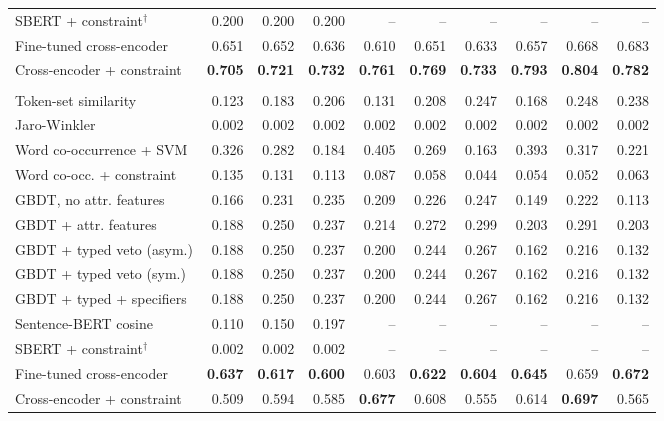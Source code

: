 \begin{table}[t]
{\begin{tabular}{lrrrrrrrrr}
SBERT + constraint$^{\dagger}$ & 0.200 & 0.200 & 0.200 & -- & -- & -- & -- & -- & -- \\
Fine-tuned cross-encoder & 0.651 & 0.652 & 0.636 & 0.610 & 0.651 & 0.633 & 0.657 & 0.668 & 0.683 \\
Cross-encoder + constraint & \textbf{0.705} & \textbf{0.721} & \textbf{0.732} & \textbf{0.761} & \textbf{0.769} & \textbf{0.733} & \textbf{0.793} & \textbf{0.804} & \textbf{0.782} \\
\addlinespace
\multicolumn{10}{l}{\textit{entity-level F1}} \\
Token-set similarity & 0.123 & 0.183 & 0.206 & 0.131 & 0.208 & 0.247 & 0.168 & 0.248 & 0.238 \\
Jaro-Winkler & 0.002 & 0.002 & 0.002 & 0.002 & 0.002 & 0.002 & 0.002 & 0.002 & 0.002 \\
Word co-occurrence + SVM \cite{peeters2024wdc} & 0.326 & 0.282 & 0.184 & 0.405 & 0.269 & 0.163 & 0.393 & 0.317 & 0.221 \\
Word co-occ. + constraint & 0.135 & 0.131 & 0.113 & 0.087 & 0.058 & 0.044 & 0.054 & 0.052 & 0.063 \\
GBDT, no attr. features & 0.166 & 0.231 & 0.235 & 0.209 & 0.226 & 0.247 & 0.149 & 0.222 & 0.113 \\
GBDT + attr. features & 0.188 & 0.250 & 0.237 & 0.214 & 0.272 & 0.299 & 0.203 & 0.291 & 0.203 \\
GBDT + typed veto (asym.) & 0.188 & 0.250 & 0.237 & 0.200 & 0.244 & 0.267 & 0.162 & 0.216 & 0.132 \\
GBDT + typed veto (sym.) & 0.188 & 0.250 & 0.237 & 0.200 & 0.244 & 0.267 & 0.162 & 0.216 & 0.132 \\
GBDT + typed + specifiers & 0.188 & 0.250 & 0.237 & 0.200 & 0.244 & 0.267 & 0.162 & 0.216 & 0.132 \\
Sentence-BERT cosine & 0.110 & 0.150 & 0.197 & -- & -- & -- & -- & -- & -- \\
SBERT + constraint$^{\dagger}$ & 0.002 & 0.002 & 0.002 & -- & -- & -- & -- & -- & -- \\
Fine-tuned cross-encoder & \textbf{0.637} & \textbf{0.617} & \textbf{0.600} & 0.603 & \textbf{0.622} & \textbf{0.604} & \textbf{0.645} & 0.659 & \textbf{0.672} \\
Cross-encoder + constraint & 0.509 & 0.594 & 0.585 & \textbf{0.677} & 0.608 & 0.555 & 0.614 & \textbf{0.697} & 0.565 \\
\bottomrule
\end{tabular}
}
\end{table}

